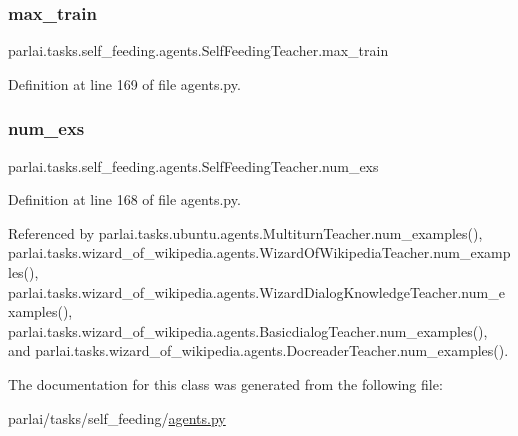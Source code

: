 \subsubsection{\texorpdfstring{max\+\_\+train}{max\_train}}
{\footnotesize\ttfamily parlai.\+tasks.\+self\+\_\+feeding.\+agents.\+Self\+Feeding\+Teacher.\+max\+\_\+train}



Definition at line 169 of file agents.\+py.

\mbox{\label{classparlai_1_1tasks_1_1self__feeding_1_1agents_1_1SelfFeedingTeacher_a6f2bcfa23af24a60b672b9ec368c09ff}} 
\subsubsection{\texorpdfstring{num\+\_\+exs}{num\_exs}}
{\footnotesize\ttfamily parlai.\+tasks.\+self\+\_\+feeding.\+agents.\+Self\+Feeding\+Teacher.\+num\+\_\+exs}



Definition at line 168 of file agents.\+py.



Referenced by parlai.\+tasks.\+ubuntu.\+agents.\+Multiturn\+Teacher.\+num\+\_\+examples(), parlai.\+tasks.\+wizard\+\_\+of\+\_\+wikipedia.\+agents.\+Wizard\+Of\+Wikipedia\+Teacher.\+num\+\_\+examples(), parlai.\+tasks.\+wizard\+\_\+of\+\_\+wikipedia.\+agents.\+Wizard\+Dialog\+Knowledge\+Teacher.\+num\+\_\+examples(), parlai.\+tasks.\+wizard\+\_\+of\+\_\+wikipedia.\+agents.\+Basicdialog\+Teacher.\+num\+\_\+examples(), and parlai.\+tasks.\+wizard\+\_\+of\+\_\+wikipedia.\+agents.\+Docreader\+Teacher.\+num\+\_\+examples().



The documentation for this class was generated from the following file\+:\begin{DoxyCompactItemize}
\item 
parlai/tasks/self\+\_\+feeding/\hyperlink{parlai_2tasks_2self__feeding_2agents_8py}{agents.\+py}\end{DoxyCompactItemize}
